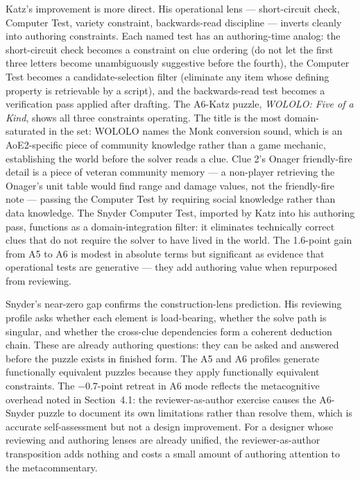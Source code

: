 Katz's improvement is more direct. His operational lens --- short-circuit check, Computer Test, variety constraint, backwards-read discipline --- inverts cleanly into authoring constraints. Each named test has an authoring-time analog: the short-circuit check becomes a constraint on clue ordering (do not let the first three letters become unambiguously suggestive before the fourth), the Computer Test becomes a candidate-selection filter (eliminate any item whose defining property is retrievable by a script), and the backwards-read test becomes a verification pass applied after drafting. The A6-Katz puzzle, \textit{WOLOLO: Five of a Kind}, shows all three constraints operating. The title is the most domain-saturated in the set: WOLOLO names the Monk conversion sound, which is an AoE2-specific piece of community knowledge rather than a game mechanic, establishing the world before the solver reads a clue. Clue 2's Onager friendly-fire detail is a piece of veteran community memory --- a non-player retrieving the Onager's unit table would find range and damage values, not the friendly-fire note --- passing the Computer Test by requiring social knowledge rather than data knowledge. The Snyder Computer Test, imported by Katz into his authoring pass, functions as a domain-integration filter: it eliminates technically correct clues that do not require the solver to have lived in the world. The 1.6-point gain from A5 to A6 is modest in absolute terms but significant as evidence that operational tests are generative --- they add authoring value when repurposed from reviewing.

Snyder's near-zero gap confirms the construction-lens prediction. His reviewing profile asks whether each element is load-bearing, whether the solve path is singular, and whether the cross-clue dependencies form a coherent deduction chain. These are already authoring questions: they can be asked and answered before the puzzle exists in finished form. The A5 and A6 profiles generate functionally equivalent puzzles because they apply functionally equivalent constraints. The $-0.7$-point retreat in A6 mode reflects the metacognitive overhead noted in Section~4.1: the reviewer-as-author exercise causes the A6-Snyder puzzle to document its own limitations rather than resolve them, which is accurate self-assessment but not a design improvement. For a designer whose reviewing and authoring lenses are already unified, the reviewer-as-author transposition adds nothing and costs a small amount of authoring attention to the metacommentary.

